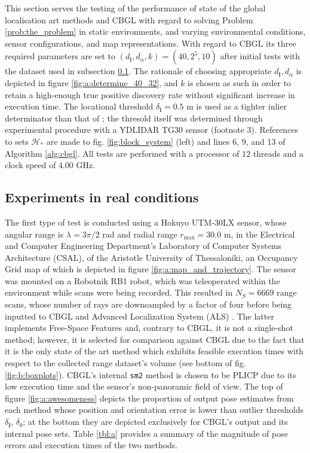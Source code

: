 This section serves the testing of the performance of state of the global
localisation art methods and CBGL with regard to solving Problem
\ref{prob:the_problem} in static environments, and varying environmental
conditions, sensor configurations, and map representations. With regard to CBGL
its three required parameters are set to $(d_{\bm{l}},d_{\alpha},k) = (40, 2^5,
10)$ after initial tests with the dataset used in subsection
\ref{subsec:exp_a}.  The rationale of choosing appropriate
$d_{\bm{l}},d_{\alpha}$ is depicted in figure \ref{fig:a:determine_40_32}, and
$k$ is chosen as such in order to retain a high-enough true positive discovery
rate without significant increase in execution time. The locational threshold
$\delta_{\bm{l}} = 0.5$ m is used as a tighter inlier determinator than that of
\cite{Filotheou2022g}; the thresold itself was determined through experimental
procedure with a YDLIDAR TG30 sensor (footnote 3).
References to sets $\mathcal{H}_{\ast}$ are made to fig. \ref{fig:block_system}
(left) and lines
6, 9, and 13 of Algorithm
\ref{alg:cbgl}.
All tests are performed with a processor of $12$
threads and a clock speed of $4.00$ GHz.


\subsection{Experiments in real conditions}
\label{subsec:exp_a}

The first type of test is conducted using a Hokuyo UTM-30LX sensor, whose
angular range is $\lambda = 3\pi/2$ rad and radial range $r_{\max} = 30.0$ m,
in the  Electrical and Computer Engineering Department's Laboratory of Computer
Systems Architecture (CSAL), of the Aristotle University of Thessaloniki, an
Occupancy Grid map of which is depicted in figure
\ref{fig:a:map_and_trajectory}. The sensor was mounted on a Robotnik RB1 robot,
which was teleoperated within the environment while scans were being recorded.
This resulted in $N_{S}=6669$ range scans, whose number of rays are downsampled
by a factor of four before being inputted to CBGL and Advanced Localization
System (ALS) \cite{als_jp}. The latter implements Free-Space Features
\cite{als_eth} and, contrary to CBGL, it is not a single-shot method;
however, it is selected for comparison against CBGL due to the fact that it is
the only state of the art method which exhibits feasible execution times with
respect to the collected range dataset's volume (see bottom of fig.
\ref{fig:b:boxplots}). CBGL's internal \texttt{sm2} method is chosen to
be PLICP \cite{Censi2008c} due to its low execution time and the sensor's
non-panoramic field of view. The top of figure \ref{fig:a:awesomeness} depicts
the proportion of output pose estimates from each method whose position and
orientation error is lower than outlier thresholds $\delta_{\bm{l}}$,
$\delta_{\theta}$; at the bottom they are depicted exclusively for CBGL's
output and its internal pose sets. Table \ref{tbl:a} provides a summary of the
magnitude of pose errors and execution times of the two methods.

